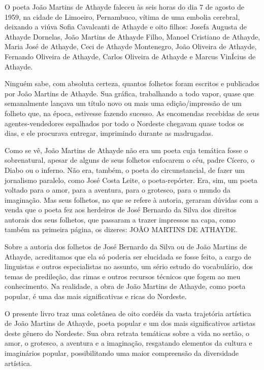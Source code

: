 \documentclass[12pt]{extarticle}
\begin{document}
O poeta João Martins de Athayde faleceu às seis horas do dia 7 de agosto
de 1959, na cidade de Limoeiro, Pernambuco, vítima de uma embolia
cerebral, deixando a viúva Sofia Cavalcanti de Athayde e oito filhos:
Josefa Augusta de Athayde Dornelas, João Martins de Athayde Filho,
Manoel Cristiano de Athayde, Maria José de Athayde, Ceci de Athayde
Montenegro, João Oliveira de Athayde, Fernando Oliveira de Athayde,
Carlos Oliveira de Athayde e Marcus VinÍcius de Athayde.

Ninguém sabe, com absoluta certeza, quantos folhetos foram escritos e
publicados por João Martins de Athayde. Sua gráfica, trabalhando a todo
vapor, quase que semanalmente lançava um título novo ou mais uma
edição/impressão de um folheto que, na época, estivesse fazendo sucesso.
As encomendas recebidas de seus agentes-vendedores espalhados por todo o
Nordeste chegavam quase todos os dias, e ele procurava entregar,
imprimindo durante as madrugadas.

Como se vê, João Martins de Athayde não era um poeta cuja temática fosse
o sobrenatural, apesar de alguns de seus folhetos enfocarem o céu, padre
Cícero, o Diabo ou o inferno. Não era, também, o poeta do
circunstancial, de fazer um jornalismo paralelo, como José Costa Leite,
o poeta-repórter. Era, sim, um poeta voltado para o amor, para a
aventura, para o grotesco, para o mundo da imaginação. Mas seus
folhetos, no que se refere à autoria, geraram dúvidas com a venda que o
poeta fez aos herdeiros de José Bernardo da Silva dos direitos autorais
dos seus folhetos, que passaram a trazer impressos na capa, como também
na primeira página, os dizeres: JOÃO MARTINS DE ATHAYDE.

Sobre a autoria dos folhetos de José Bernardo da Silva ou de João
Martins de Athayde, acreditamos que ela só poderia ser elucidada se
fosse feito, a cargo de linguistas e outros especialistas no assunto, um
sério estudo do vocabulário, dos temas de predileção, das rimas e outros
recursos técnicos que fogem ao meu conhecimento. Na realidade, a obra de
João Martins de Athayde, como poeta popular, é uma das mais
significativas e ricas do Nordeste.

O presente livro traz uma coletânea de oito cordéis da vasta trajetória
artística de João Martins de Athayde, poeta popular e um dos mais
significativos artistas deste gênero do Nordeste. Sua obra retrata
temáticas sobre a vida no sertão, o amor, o grotesco, a aventura e a
imaginação, resgatando elementos da cultura e imaginários popular,
possibilitando uma maior compreensão da diversidade artística.
\end{document}
